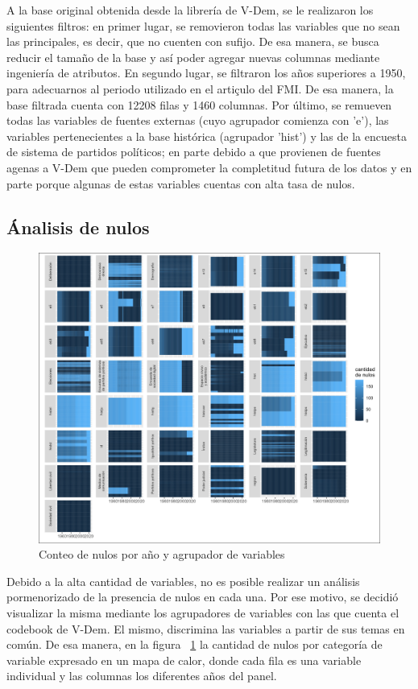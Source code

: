 \documentclass{article}
\begin{document}
A la base original obtenida desde la librería de V-Dem, se le realizaron los
siguientes filtros: en primer lugar, se removieron todas las variables que
no sean las principales, es decir, que no cuenten con sufijo. De esa manera,
se busca reducir el tamaño de la base y así poder agregar nuevas columnas
mediante ingeniería de atributos. En segundo lugar, se filtraron los años 
superiores a 1950, para adecuarnos al periodo utilizado en el artiçulo del FMI.
De esa manera, la base filtrada cuenta con 12208 filas y 1460 columnas. Por último,
se remueven todas las variables de fuentes externas (cuyo agrupador comienza con
'e'), las variables pertenecientes a la base histórica (agrupador 'hist') y las
de la encuesta de sistema de partidos políticos; en parte debido a que provienen
de fuentes agenas a V-Dem que pueden comprometer la completitud futura de los datos
y en parte porque algunas de estas variables cuentas con alta tasa de nulos.

\subsection{Ánalisis de nulos}

\begin{figure}[H]
  \centering  
  \includegraphics[width=1\textwidth]{1_nas.png}
  \caption{Conteo de nulos por año y agrupador de variables\label{fig:nas}}
\end{figure}

Debido a la alta cantidad de variables, no es posible realizar un análisis
pormenorizado de la presencia de nulos en cada una. Por ese motivo, se decidió
visualizar la misma mediante los agrupadores de variables con las que cuenta el
codebook de V-Dem. El mismo, discrimina las variables a partir de sus temas en 
común. De esa manera, en la figura ~\ref{fig:nas} la cantidad de nulos por 
categoría de variable expresado en un mapa de calor, donde cada fila es una 
variable individual y las columnas los diferentes años del panel.
\end{document}
